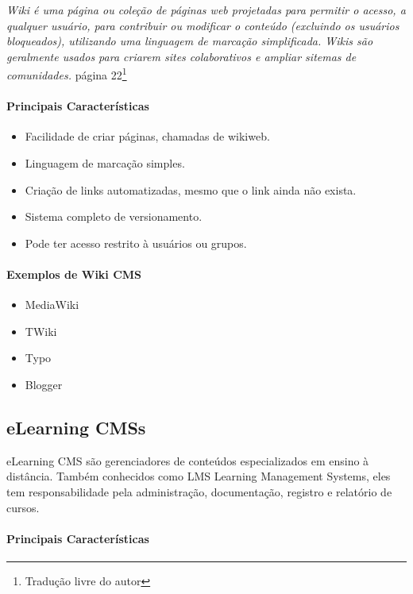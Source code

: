 \emph{Wiki é uma página ou coleção de páginas web projetadas para permitir o acesso, a qualquer usuário, para contribuir ou modificar o conteúdo (excluindo os usuários bloqueados), utilizando uma linguagem de marcação simplificada. Wikis são geralmente usados para criarem sites colaborativos e ampliar sitemas de comunidades.}
\cite{choosing_open_source_cms}{página 22}\footnote{Tradução livre do autor} 


\paragraph{Principais Características}

\begin{itemize}
  \item Facilidade de criar páginas, chamadas de wikiweb.
  \item Linguagem de marcação simples.
  \item Criação de links automatizadas, mesmo que o link ainda não exista.
  \item Sistema completo de versionamento.
  \item Pode ter acesso restrito à usuários ou grupos.
\end{itemize}

\paragraph{Exemplos de Wiki CMS} 

\begin{itemize}
  \item MediaWiki
  \item TWiki
  \item Typo
  \item Blogger
\end{itemize}


\subsection{eLearning CMSs} 

eLearning CMS são gerenciadores de conteúdos especializados em ensino à distância. Também conhecidos como LMS Learning Management Systems, eles tem responsabilidade pela administração, documentação, registro e relatório de cursos.
 
\paragraph{Principais Características}

